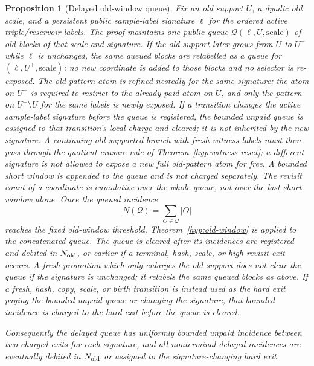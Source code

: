 \documentclass[11pt]{article}
\newtheorem{proposition}[theorem]{Proposition}
\begin{document}
\begin{proposition}[Delayed old-window queue]
\label{prop:delayed-old-queue}
Fix an old support $U$, a dyadic old scale, and a persistent public
sample-label signature $\ell$ for the ordered active triple/reservoir labels.
The proof maintains one
public queue $\mathcal Q(\ell,U,\mathrm{scale})$ of old blocks of that scale and
signature.  If the old support later grows from $U$ to $U^+$ while $\ell$ is
unchanged, the same queued blocks are relabelled as a queue for
$(\ell,U^+,\mathrm{scale})$; no new coordinate is added to those blocks and no
selector is re-exposed.  The old-pattern atom is refined nestedly for the same
signature: the atom on $U^+$ is required to restrict to the already paid atom on
$U$, and only the pattern on $U^+\setminus U$ for the same labels is newly
exposed.  If a transition changes the active sample-label signature before the
queue is registered, the bounded unpaid queue is assigned to that transition's
local charge and cleared; it is not inherited by the new signature.  A
continuing old-supported branch with fresh witness labels must then pass
through the quotient-erasure rule of Theorem~\ref{hyp:witness-reset}; a
different signature is not allowed to expose a new full old-pattern atom for
free.  A bounded
short window is appended to the queue and is not charged separately.  The
revisit count of a coordinate is cumulative over the whole queue, not over the
last short window alone.  Once
the queued incidence
\[
  N(\mathcal Q)=\sum_{O\in\mathcal Q}|O|
\]
reaches the fixed old-window threshold, Theorem~\ref{hyp:old-window} is
applied to the concatenated queue.  The queue is cleared after its incidences
are registered and debited in $N_{\rm old}$, or earlier if a terminal, hash, scale, or
high-revisit exit occurs.  A fresh promotion which only enlarges the old
support does not clear the queue if the signature is unchanged; it relabels the
same queued blocks as above.  If a fresh, hash, copy, scale, or birth transition
is instead used as the hard exit paying the bounded unpaid queue or changing the
signature, that bounded incidence is charged to the hard exit before the queue
is cleared.

Consequently the delayed queue has uniformly bounded unpaid incidence between
two charged exits for each signature, and all nonterminal delayed incidences are
eventually debited in $N_{\rm old}$ or assigned to the signature-changing hard
exit.
\end{proposition}
\end{document}
